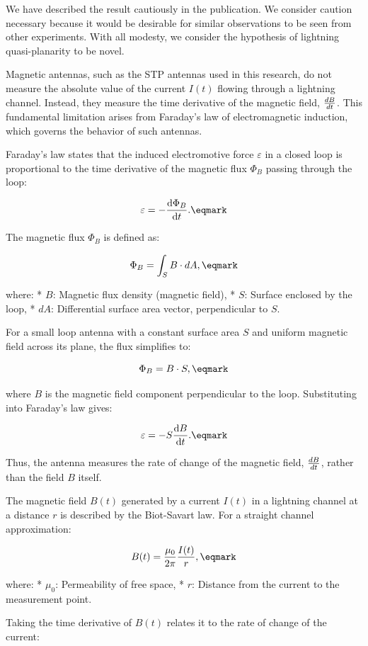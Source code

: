 We have described the result cautiously in the publication\mycite[j1]. We consider caution necessary because it would be desirable for similar observations to be seen from other experiments. With all modesty, we consider the hypothesis of lightning quasi-planarity to be novel.

Magnetic antennas, such as the STP antennas used in this research, do not measure the absolute value of the current 
$I(t)$ flowing through a lightning channel. Instead, they measure the time derivative of the magnetic field, 
${ dB \over dt }$. This fundamental limitation arises from Faraday's law of electromagnetic induction, which governs the behavior of such antennas.

Faraday's law states that the induced electromotive force $\varepsilon$ in a closed loop is proportional to the time 
derivative of the magnetic flux $\Phi_B$ passing through the loop:

$$
\varepsilon = -{ \hbox{\rm d}\Phi_B \over \hbox{\rm d}t }.
\eqmark
$$

The magnetic flux $\Phi_B$ is defined as:

$$
\Phi_B = \int_S B \cdot dA,
\eqmark
$$

where:
\begitems
* $B$: Magnetic flux density (magnetic field),
* $S$: Surface enclosed by the loop,
* $dA$: Differential surface area vector, perpendicular to $S$.
\enditems

For a small loop antenna with a constant surface area $S$ and uniform magnetic field across its plane, the flux simplifies to:

$$
\Phi_B = B \cdot S,
\eqmark
$$

where $B$ is the magnetic field component perpendicular to the loop. Substituting into Faraday's law gives:

$$
\varepsilon = -S { \hbox{\rm d}B \over \hbox{\rm d}t }.
\eqmark
$$

Thus, the antenna measures the rate of change of the magnetic field, ${ dB \over dt }$, rather than the field $B$ itself.

The magnetic field $B(t)$ generated by a current $I(t)$ in a lightning channel at a distance $r$ is described by the Biot-Savart law. For a straight channel approximation:

$$
B(t) = {\mu_0 \over 2\pi} {I(t) \over r},
\eqmark
$$

where:
\begitems
* $\mu_0$: Permeability of free space,
* $r$: Distance from the current to the measurement point.
\enditems

Taking the time derivative of $B(t)$ relates it to the rate of change of the current:

